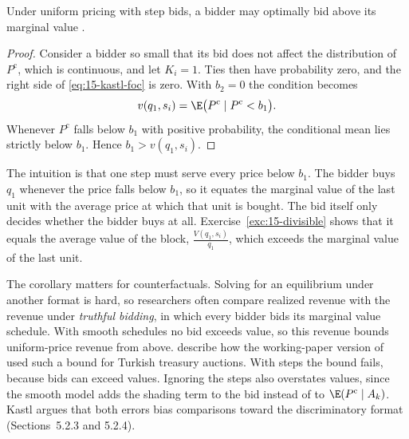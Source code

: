 \begin{corollary}\label{cor:15-kastl-above}
Under uniform pricing with step bids, a bidder may optimally bid above its marginal value
\citep[Corollary~1]{Kastl2011}.
\end{corollary}

\begin{proof}
Consider a bidder so small that its bid does not affect the distribution of $P^{\mathrm c}$, which is
continuous, and let $K_i=1$. Ties then have probability zero, and the right side of \eqref{eq:15-kastl-foc}
is zero. With $b_2=0$ the condition becomes
\[
v(q_1,s_i)=\E\bigl(P^{\mathrm c}\mid P^{\mathrm c}<b_1\bigr).
\]
Whenever $P^{\mathrm c}$ falls below $b_1$ with positive probability, the conditional mean lies strictly
below $b_1$. Hence $b_1>v(q_1,s_i)$.
\end{proof}

The intuition is that one step must serve every price below $b_1$. The bidder buys $q_1$ whenever the price
falls below $b_1$, so it equates the marginal value of the last unit with the average price at which that
unit is bought. The bid itself only decides whether the bidder buys at all. Exercise~\ref{exc:15-divisible}
shows that it equals the average value of the block, $\frac{V(q_1,s_i)}{q_1}$, which exceeds the marginal
value of the last unit.

The corollary matters for counterfactuals. Solving for an equilibrium under another format is hard, so
researchers often compare realized revenue with the revenue under \emph{truthful bidding}, in which every
bidder bids its marginal value schedule. With smooth schedules no bid exceeds value, so this revenue bounds
uniform-price revenue from above. \citet[Section~10]{AtheyHaile2007} describe how the working-paper version
of \citet{HortacsuMcAdams2010} used such a bound for Turkish treasury auctions. With steps the bound fails,
because bids can exceed values. Ignoring the steps also overstates values, since the smooth model adds the
shading term to the bid instead of to $\E(P^{\mathrm c}\mid A_k)$. Kastl argues that both errors bias
comparisons toward the discriminatory format (Sections~5.2.3 and 5.2.4).


